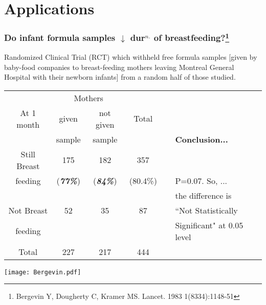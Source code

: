 \documentclass[10pt]{beamer}\usepackage[]{graphicx}\usepackage[]{color}
\begin{document}
\section{Applications}


\begin{frame}
	\frametitle{Do infant formula samples $\downarrow$ dur$^{n.}$ of breastfeeding?\footnote{{\footnotesize Bergevin Y, Dougherty C, Kramer MS. Lancet. 1983 1(8334):1148-51}}}
	
	
	
	Randomized Clinical Trial (RCT) which withheld free formula samples [given by baby-food companies to breast-feeding mothers leaving Montreal General Hospital with their newborn infants] from a random half of those studied.
	
	\begin{scriptsize}
		\begin{center}
			\begin{tabular}{|c c c c c| l|}
				\hline
				& \multicolumn{2}{c}{Mothers}  & & & \\
				At 1 month & given & not given & Total  & $ \ $ &  \\
				& sample & sample & & & \textbf{Conclusion...} \\ 
				\hline
				Still Breast & 175 & 182 & 357 & & \\ 
				feeding & (\textbf{\textit{77\%}}) & (\textbf{\textit{84\%}}) & (80.4\%) & 
				& P=0.07. So, ...  \\ 
				& & & & & the difference is   \\
				Not Breast & 52 & 35 & 87  &  &  ``Not Statistically \\ 
				feeding &  & & & &  Significant" at 0.05 level  \\
				\hline
				Total & 227 & 217 &  444 & & \\
				\hline
			\end{tabular}
		\end{center}
	\end{scriptsize}
	
	\begin{center}
		\texttt{[image: Bergevin.pdf]}
	\end{center}
	
\end{frame}
\end{document}

